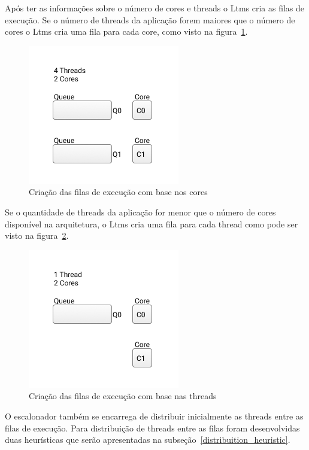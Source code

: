 \documentclass[diss,capa]{texufpel}
\begin{document}
Após ter as informações sobre o número de cores e threads o Ltms cria as filas de execução. Se o número de threads da aplicação forem maiores que o número de cores o Ltms cria uma fila para cada core, como visto na figura~\ref{queue_core}.

\begin{figure}[htbp]
  \centering
  \includegraphics[scale=.8]{images/Queue_core.png}
  \caption{Criação das filas de execução com base nos cores}
\label{queue_core}
\end{figure}

Se o quantidade de threads da aplicação for menor que o número de cores disponível na arquitetura, o Ltms cria uma fila para cada thread como pode ser visto na figura~\ref{queue_thread}.

\begin{figure}[htbp]
  \centering
  \includegraphics[scale=.8]{images/Queues_thread.png}
\caption{Criação das filas de execução com base nas threads} 
\label{queue_thread}
\end{figure}

O escalonador também se encarrega de distribuir inicialmente as threads entre as filas de execução. Para distribuição de threads entre as filas foram desenvolvidas duas heurísticas que serão apresentadas na subseção~\ref{distribuition_heuristic}.
\end{document}
